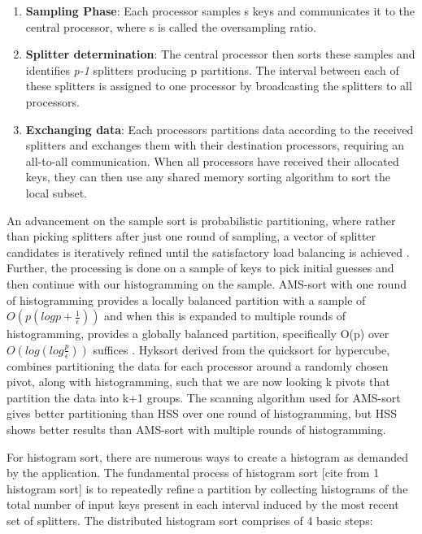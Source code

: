 \documentclass[11pt]{article}       %
\begin{document}
\begin{enumerate}
\item \textbf{Sampling Phase}: Each processor samples s keys and communicates it to the central processor, where s is called the oversampling ratio. 
\item \textbf{Splitter determination}: The central processor then sorts these samples and identifies \emph{p-1} splitters producing p partitions. The interval between each of these splitters is assigned to one processor by broadcasting the splitters to all processors.
\item \textbf{Exchanging data}: Each processors partitions data according to the received splitters and exchanges them with their destination processors, requiring an all-to-all communication. When all processors have received their allocated keys, they can then use any shared memory sorting algorithm \cite{two_massive} to sort the local subset.
\end{enumerate} \par
An advancement on the sample sort is probabilistic partitioning, where rather than picking splitters after just one round of sampling, a vector of splitter candidates is iteratively refined until the satisfactory load balancing is achieved \cite{paper2}. Further, the processing is done on a sample of keys to pick initial guesses and then continue with our histogramming on the sample. AMS-sort with one round of histogramming provides a locally balanced partition with a sample of $ O\left(p \left(log p + \frac {1}{\epsilon}\right)\right) $ \cite{axtmann} and when this is expanded to multiple rounds of histogramming, provides a globally balanced partition, specifically O(p) over $ O\left( log \left( log \frac {p}{\epsilon}\right)\right) $ suffices \cite{paper1}. Hyksort \cite{hyksort} derived from the quicksort for hypercube, combines partitioning the data for each processor around a randomly chosen pivot, along with histogramming, such that we are now looking k pivots that partition the data into k+1 groups. The scanning algorithm used for AMS-sort \cite{axtmann} gives better partitioning than HSS \cite{paper1} over one round of histogramming, but HSS shows better results than AMS-sort with multiple rounds of histogramming.  \par
For histogram sort, there are numerous ways to create a histogram \cite{versatile} as demanded by the application. The fundamental process of histogram sort [cite from 1 histogram sort] is to repeatedly refine a partition by collecting histograms of the total number of input keys present in each interval induced by the most recent set of splitters. The distributed histogram sort \cite{paper2} comprises of 4 basic steps:
\end{document}
